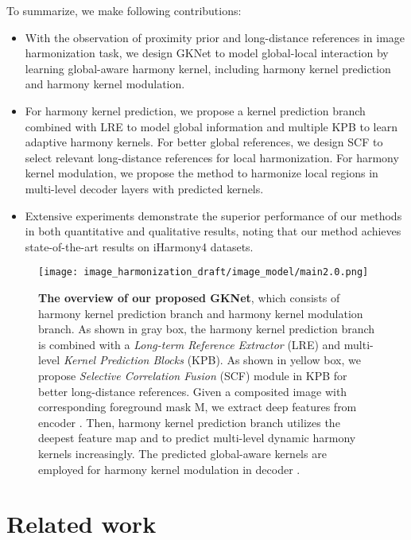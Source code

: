 \documentclass[10pt,twocolumn,letterpaper]{article}
\begin{document}
To summarize, we make following contributions: 
\begin{itemize}[leftmargin=*]
\vspace{-2pt}
\item With the observation of proximity prior and long-distance references in image harmonization task, we design GKNet to model global-local interaction by learning global-aware harmony kernel, including harmony kernel prediction and harmony kernel modulation.
\vspace{-4pt}
\item For harmony kernel prediction, we propose a kernel prediction branch combined with LRE to model global information and multiple KPB to learn adaptive harmony kernels. For better global references, we design SCF to select relevant long-distance references for local harmonization. For harmony kernel modulation, we propose the method to harmonize local regions in multi-level decoder layers with predicted kernels.
\vspace{-4pt}

\item Extensive experiments demonstrate the superior performance of our methods in both quantitative and qualitative results, noting that our method achieves state-of-the-art results on iHarmony4 datasets.

\end{itemize}

\begin{figure*}[t]
  \centering
  \texttt{[image: image\_harmonization\_draft/image\_model/main2.0.png]}
  \caption{{\bf The overview of our proposed GKNet}, which consists of harmony kernel prediction branch and harmony kernel modulation branch. As shown in gray box, the harmony kernel prediction branch is combined with a \emph{Long-term Reference Extractor} (LRE) and multi-level \emph{Kernel Prediction Blocks} (KPB). As shown in yellow box, we propose \emph{Selective Correlation Fusion} (SCF) module in KPB for better long-distance references. Given a composited image  with corresponding foreground mask M, we extract deep features  from encoder . Then, harmony kernel prediction branch utilizes the deepest feature map and  to predict multi-level dynamic harmony kernels  increasingly. The predicted global-aware kernels are employed for harmony kernel modulation in decoder .}
  \label{fig:main_model}
\end{figure*}
\vspace{-5pt}
\section{Related work}
\end{document}
